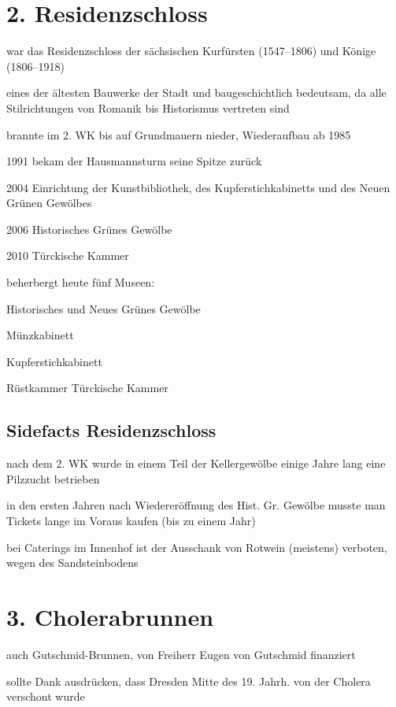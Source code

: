 \documentclass[a4paper,12pt]{report}
\begin{document}
\section{2. Residenzschloss}
\begin{itemize*}
\item war das Residenzschloss der sächsischen Kurfürsten (1547–1806) und Könige (1806–1918)
\item eines der ältesten Bauwerke der Stadt und baugeschichtlich bedeutsam, da alle Stilrichtungen von Romanik bis Historismus vertreten sind
\item brannte im 2. WK bis auf Grundmauern nieder, Wiederaufbau ab 1985
    \begin{itemize*}
    \item 1991 bekam der Hausmannsturm seine Spitze zurück
    \item 2004 Einrichtung der Kunstbibliothek, des Kupferstichkabinetts und des Neuen Grünen Gewölbes
    \item 2006 Historisches Grünes Gewölbe
    \item 2010 Türckische Kammer
    \end{itemize*}
\item beherbergt heute fünf Museen:
    \begin{itemize*}
    \item Historisches und Neues Grünes Gewölbe
    \item Münzkabinett
    \item Kupferstichkabinett
    \item Rüstkammer Türckische Kammer
    \end{itemize*}
\end{itemize*}
\subsection{Sidefacts Residenzschloss}
\begin{itemize*}
\item nach dem 2. WK wurde in einem Teil der Kellergewölbe einige Jahre lang eine Pilzzucht betrieben
\item in den ersten Jahren nach Wiedereröffnung des Hist. Gr. Gewölbe musste man Tickets lange im Voraus kaufen (bis zu einem Jahr)
\item bei Caterings im Innenhof ist der Ausschank von Rotwein (meistens) verboten, wegen des Sandsteinbodens
\end{itemize*}

\section{3. Cholerabrunnen}
\begin{itemize*}
\item auch Gutschmid-Brunnen, von Freiherr Eugen von Gutschmid finanziert
\item sollte Dank ausdrücken, dass Dresden Mitte des 19. Jahrh. von der Cholera verschont wurde
\end{itemize*}
\end{document}
